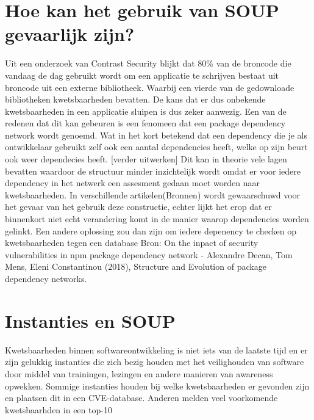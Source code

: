 \section{Hoe kan het gebruik van SOUP gevaarlijk zijn?}\label{sec:hoe-kan-het-gebruik-van-soup-gevaarlijk-zijn?}
Uit een onderzoek van Contrast Security blijkt dat 80\% van de broncode die vandaag de dag gebruikt wordt om een applicatie te schrijven bestaat uit broncode uit een externe bibliotheek.
Waarbij een vierde van de gedownloade bibliotheken kwetsbaarheden bevatten.
De kans dat er dus onbekende kwetsbaarheden in een applicatie sluipen is dus zeker aanwezig.
Een van de redenen dat dit kan gebeuren is een fenomeen dat een package dependency network wordt genoemd.
Wat in het kort betekend dat een dependency die je als ontwikkelaar gebruikt zelf ook een aantal dependencies heeft, welke op zijn beurt ook weer dependecies heeft.
[verder uitwerken]
Dit kan in theorie vele lagen bevatten waardoor de structuur minder inzichtelijk wordt omdat er voor iedere dependency in het netwerk een assesment gedaan moet worden naar kwetsbaarheden.
In verschillende artikelen(Bronnen) wordt gewaarschuwd voor het gevaar van het gebruik deze constructie, echter lijkt het erop dat er binnenkort niet echt verandering komt in de manier waarop dependencies worden gelinkt.
Een andere oplossing zou dan zijn om iedere depenency te checken op kwetsbaarheden tegen een database
Bron: On the inpact of security vulnerabilities in npm package dependency network - Alexandre Decan, Tom Mens, Eleni Constantinou (2018), Structure and Evolution of package dependency networks.

\section{Instanties en SOUP}\label{sec:instanties-en-soup}
Kwetsbaarheden binnen softwareontwikkeling is niet iets van de laatste tijd en er zijn gelukkig instanties die zich bezig houden met het veilighouden van software door middel van trainingen, lezingen en andere manieren van awareness opwekken.
Sommige instanties houden bij welke kwetsbaarheden er gevonden zijn en plaatsen dit in een CVE-database.
Anderen melden veel voorkomende kwetsbaarhden in een top-10


